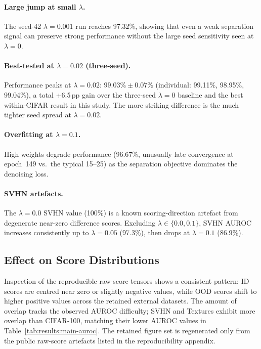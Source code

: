 \paragraph{Large jump at small $\lambda$.}
The seed-42 $\lambda = 0.001$ run reaches 97.32\%, showing that even a
weak separation signal can preserve strong performance without the large
seed sensitivity seen at $\lambda = 0$.

\paragraph{Best-tested at $\lambda = 0.02$ (three-seed).}
Performance peaks at $\lambda = 0.02$:
$99.03\% \pm 0.07\%$ (individual: 99.11\%, 98.95\%, 99.04\%), a total
+6.5\,pp gain over the three-seed $\lambda = 0$ baseline and the best
within-CIFAR result in this study. The more striking difference is the
much tighter seed spread at $\lambda = 0.02$.

\paragraph{Overfitting at $\lambda = 0.1$.}
High weights degrade performance (96.67\%, unusually late convergence at
epoch~149 vs.\ the typical 15--25) as the separation objective dominates
the denoising loss.

\paragraph{SVHN artefacts.}
The $\lambda = 0.0$ SVHN value (100\%) is a known scoring-direction
artefact from degenerate near-zero difference scores.
Excluding $\lambda \in \{0.0, 0.1\}$, SVHN AUROC increases consistently
up to $\lambda = 0.05$ (97.3\%), then drops at $\lambda = 0.1$
(86.9\%).

\subsection{Effect on Score Distributions}
\label{sec:results:separation:distributions}

Inspection of the reproducible raw-score tensors shows a consistent
pattern: ID scores are centred near zero or slightly negative values,
while OOD scores shift to higher positive values across the retained
external datasets. The amount of overlap tracks the observed AUROC
difficulty; SVHN and Textures exhibit more overlap than CIFAR-100,
matching their lower AUROC values in
Table~\ref{tab:results:main-auroc}. The retained figure set is regenerated
only from the public raw-score artefacts listed in the reproducibility appendix.

